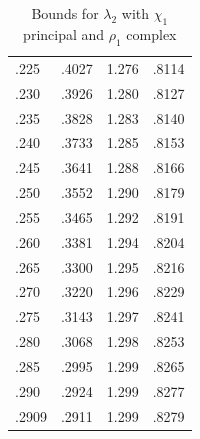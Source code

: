 \documentclass[12pt,psamsfonts]{amsart}
\theoremstyle{definition}
\theoremstyle{remark}
\numberwithin{equation}{section}
\begin{document}
\begin{table}
\begin{tabular}{l|c|c|c}
 .225 &  .4027 &  1.276 &  .8114 \\ 
 .230 &  .3926 &  1.280 &  .8127 \\ 
 .235 &  .3828 &  1.283 &  .8140 \\ 
 .240 &  .3733 &  1.285 &  .8153 \\ 
 .245 &  .3641 &  1.288 &  .8166 \\ 
 .250 &  .3552 &  1.290 &  .8179 \\ 
 .255 &  .3465 &  1.292 &  .8191 \\ 
 .260 &  .3381 &  1.294 &  .8204 \\ 
 .265 &  .3300 &  1.295 &  .8216 \\ 
 .270 &  .3220 &  1.296 &  .8229 \\ 
 .275 &  .3143 &  1.297 &  .8241 \\ 
 .280 &  .3068 &  1.298 &  .8253 \\ 
 .285 &  .2995 &  1.299 &  .8265 \\ 
 .290 &  .2924 &  1.299 &  .8277 \\ 
 .2909 &  .2911 &  1.299 &  .8279 \\ 
\end{tabular}
\caption{Bounds for $\lambda_2$ with $\chi_1$ principal and $\rho_1$ complex}
\label{Table-L2-CC_Chi1Principal}
\end{table}
\end{document}

